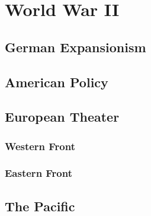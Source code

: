 \chapter{World War II}

\section{German Expansionism}

\section{American Policy}

\section{European Theater}

\subsection*{Western Front}

\subsection*{Eastern Front}

\section{The Pacific}
